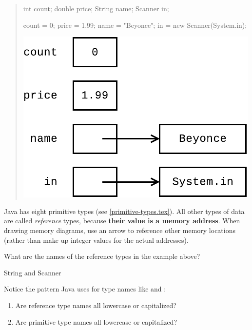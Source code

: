 
\begin{quote}
\begin{multicols}{2}

\begin{javalst}
int count;
double price;
String name;
Scanner in;

count = 0;
price = 1.99;
name = "Beyonce";
in = new Scanner(System.in);
\end{javalst}

\includegraphics[width=\linewidth]{reference1.pdf}

\end{multicols}
\end{quote}

Java has eight primitive types (see \ref{primitive-types.tex}).
All other types of data are called \emph{reference} types, because \textbf{their value is a memory address}.
When drawing memory diagrams, use an arrow to reference other memory locations (rather than make up integer values for the actual addresses).




\Q What are the names of the reference types in the example above?

\begin{answer}[2em]
String and Scanner
\end{answer}


\Q Notice the pattern Java uses for type names like  and :

\begin{enumerate}

\item Are reference type names all lowercase or capitalized?

\item Are primitive type names all lowercase or capitalized?

\end{enumerate}


